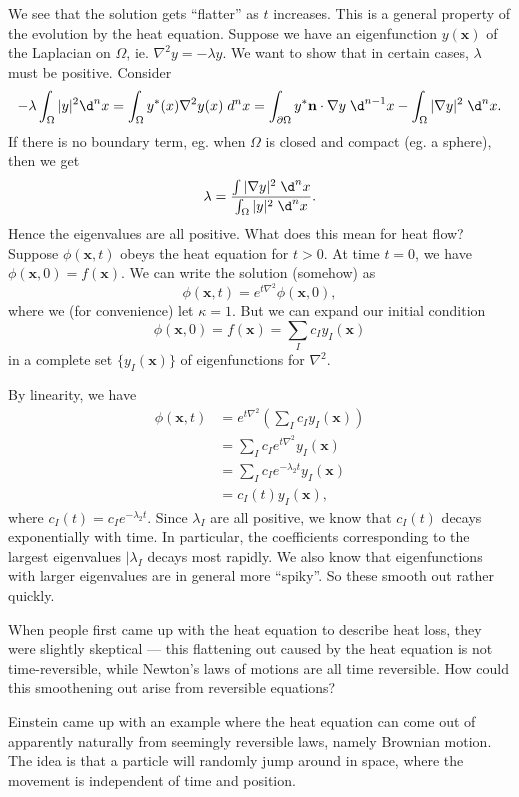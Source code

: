 \documentclass[a4paper]{article}
\begin{document}
We see that the solution gets ``flatter'' as $t$ increases. This is a general property of the evolution by the heat equation. Suppose we have an eigenfunction $y(\mathbf{x})$ of the Laplacian on $\Omega$, ie. $\nabla^2 y = -\lambda y$. We want to show that in certain cases, $\lambda$ must be positive. Consider
\[
  - \lambda \int_\Omega |y|^2 \d^n x = \int_\Omega y^*(x) \nabla^2 y(x)\;d^n x = \int_{\partial\Omega} y^* \mathbf{n}\cdot \nabla y \;\d^{n - 1}x - \int_\Omega |\nabla y|^2 \;\d^n x.
\]
If there is no boundary term, eg. when $\Omega$ is closed and compact (eg. a sphere), then we get
\[
  \lambda = \frac{\int |\nabla y|^2\;\d^n x}{\int_\Omega |y|^2 \;\d^n x}.
\]
Hence the eigenvalues are all positive. What does this mean for heat flow? Suppose $\phi(\mathbf{x}, t)$ obeys the heat equation for $t > 0$. At time $t = 0$, we have $\phi(\mathbf{x}, 0) = f(\mathbf{x})$. We can write the solution (somehow) as
\[
  \phi(\mathbf{x}, t) = e^{t\nabla^2} \phi(\mathbf{x}, 0),
\]
where we (for convenience) let $\kappa = 1$. But we can expand our initial condition
\[
  \phi(\mathbf{x}, 0) = f(\mathbf{x}) = \sum_I c_I y_I(\mathbf{x})
\]
in a complete set $\{y_I(\mathbf{x})\}$ of eigenfunctions for $\nabla^2$.

By linearity, we have
\begin{align*}
  \phi(\mathbf{x}, t) &= e^{t \nabla^2}\left(\sum_I c_I y_I(\mathbf{x})\right) \\
  &= \sum_I c_I e^{t \nabla^2 }y_I(\mathbf{x}) \\
  &= \sum_I c_I e^{-\lambda_2 t}y_I(\mathbf{x}) \\
  &= c_I(t) y_I(\mathbf{x}),
\end{align*}
where $c_I(t) = c_I e^{-\lambda_2 t}$. Since $\lambda_I$ are all positive, we know that $c_I(t)$ decays exponentially with time. In particular, the coefficients corresponding to the largest eigenvalues $|\lambda_I$ decays most rapidly. We also know that eigenfunctions with larger eigenvalues are in general more ``spiky''. So these smooth out rather quickly.

When people first came up with the heat equation to describe heat loss, they were slightly skeptical --- this flattening out caused by the heat equation is not time-reversible, while Newton's laws of motions are all time reversible. How could this smoothening out arise from reversible equations?

Einstein came up with an example where the heat equation can come out of apparently naturally from seemingly reversible laws, namely Brownian motion. The idea is that a particle will randomly jump around in space, where the movement is independent of time and position.
\end{document}
